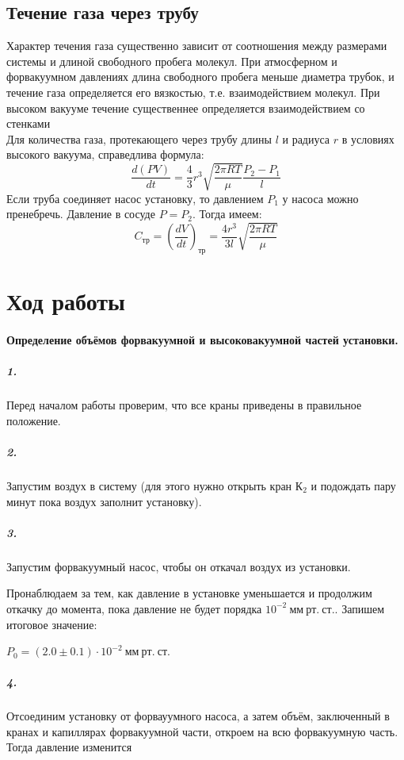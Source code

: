 \documentclass[a4paper,12pt]{article}
\begin{document}
\subsection*{Течение газа через трубу}
Характер течения газа существенно зависит от соотношения между размерами системы и длиной свободного пробега молекул. При атмосферном и форвакуумном давлениях  длина свободного пробега меньше диаметра трубок, и течение газа определяется его вязкостью, т.е. взаимодействием молекул. При высоком вакууме течение существеннее определяется взаимодействием со стенками \\
Для количества газа, протекающего через трубу длины $l$ и радиуса $r$ в условиях высокого вакуума, справедлива формула:
\begin{equation}
	\frac{d(PV)}{dt} = \frac{4}{3}r^3\sqrt{\frac{2\pi RT}{\mu}}\frac{P_2 - P_1}{l}
\end{equation}
Если труба соединяет насос установку, то давлением $P_1$ у насоса можно пренебречь. Давление в сосуде $P = P_2$. Тогда имеем:
\begin{equation}
C_\text{тр} = \left(\frac{dV}{dt}\right)_\text{тр} = \frac{4r^3}{3l}\sqrt{\frac{2\pi RT}{\mu}}
\end{equation}
\newpage
\section*{Ход работы}

\paragraph{Определение объёмов форвакуумной и высоковакуумной частей установки.}

\subparagraph{1.} Перед началом работы проверим, что все краны приведены в правильное положение. 

\subparagraph{2.} Запустим воздух в систему (для этого нужно открыть кран $К_2$  и подождать пару минут пока воздух заполнит установку). 

\subparagraph{3.} Запустим форвакуумный насос, чтобы он откачал воздух из установки. 

Пронаблюдаем за тем, как давление в установке уменьшается и продолжим откачку до момента, пока давление не будет порядка $ 10^{-2}~мм~рт.~ ст.$. Запишем итоговое значение: 

$
P_0 = (2.0 \pm 0.1) \cdot 10^{-2}~мм~рт.~ ст.
$

\subparagraph{4.} Отсоединим установку от форвауумного насоса, а затем объём, заключенный в кранах и капиллярах форвакуумной части, откроем на всю форвакуумную часть. Тогда давление изменится
\end{document}
